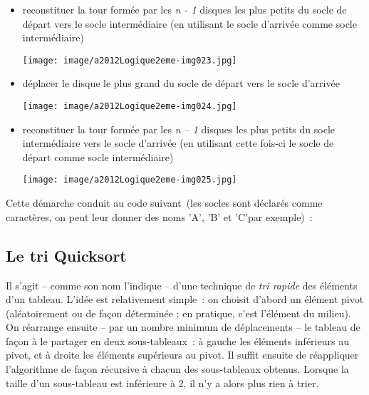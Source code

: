 		\begin{itemize}
			\item {
				reconstituer la tour formée par les \textit{n - 1} disques les plus 
				petits du socle de départ vers le socle intermédiaire (en utilisant 
				le socle d'arrivée comme socle intermédiaire)}
				
				\begin{center}
				\texttt{[image: image/a2012Logique2eme-img023.jpg]}
				\end{center}
				
			\item {
				déplacer le disque le plus grand du socle de départ vers le socle d'arrivée}
				\begin{center}
				\texttt{[image: image/a2012Logique2eme-img024.jpg]}
				\end{center}
			
			\item {
				reconstituer la tour formée par les \textit{n -- 1} disques les plus 
				petits du socle intermédiaire vers le socle d'arrivée (en utilisant 
				cette fois-ci le socle de départ comme socle intermédiaire)}
			\begin{center}
			\texttt{[image: image/a2012Logique2eme-img025.jpg]}
			\end{center}
		\end{itemize}
		
		Cette démarche conduit au code suivant~(les socles sont déclarés comme
		caractères, on peut leur donner des noms 'A', 'B' et 'C'par exemple)~:


	\subsection{Le tri Quicksort}
	
		Il s'agit -- comme son nom l'indique -- d'une technique de 
		\textit{tri rapide} des éléments d'un tableau. L'idée est
		relativement simple~: on choisit d'abord un élément pivot 
		(aléatoirement ou de façon déterminée ; en pratique, c'est
		l'élément du milieu). On réarrange ensuite -- par un nombre 
		minimum de déplacements -- le tableau de façon à le partager 
		en deux sous-tableaux~: à gauche les éléments inférieurs au 
		pivot, et à droite les éléments supérieurs au pivot. Il suffit 
		ensuite de réappliquer l'algorithme de façon récursive à chacun 
		des sous-tableaux obtenus. Lorsque la taille d'un sous-tableau 
		est inférieure à 2, il n'y a alors plus rien à trier.

